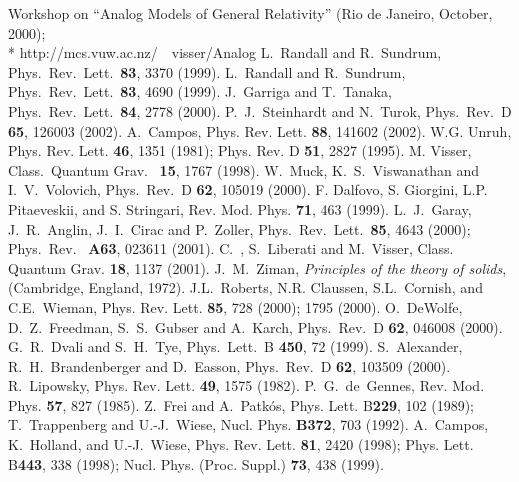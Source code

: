 \documentclass[a4paper,prl,showpacs,twocolumn]{revtex4}
\begin{document}
\begin{thebibliography}{99}

Workshop on ``Analog Models of General Relativity'' (Rio de Janeiro,
October, 2000); 
\\*
{\sf http://mcs.vuw.ac.nz/~\myHighlight{$\tilde{}$}\coordHE{}~visser/Analog}
L.~Randall and R.~Sundrum,
Phys.\ Rev.\ Lett.\  {\bf 83}, 3370 (1999).
L.~Randall and R.~Sundrum,
Phys.\ Rev.\ Lett.\  {\bf 83}, 4690 (1999).
J.~Garriga and T.~Tanaka, 
Phys.\ Rev.\ Lett.\ {\bf 84}, 2778 (2000). 
P.~J.~Steinhardt and N.~Turok,
Phys.\ Rev.\ D {\bf 65}, 126003 (2002).
A.~Campos,
  Phys. Rev. Lett. {\bf 88}, 141602 (2002).
W.G. Unruh, 
Phys. Rev. Lett. {\bf 46}, 1351 (1981);
Phys. Rev. D {\bf 51}, 2827 (1995). 
M. Visser,
Class.~Quantum Grav.~ {\bf 15}, 1767 (1998).
W.~Muck, K.~S.~Viswanathan and I.~V.~Volovich,
Phys.\ Rev.\ D {\bf 62}, 105019 (2000).
F. Dalfovo, S. Giorgini, L.P. Pitaeveskii, and S. Stringari,
Rev. Mod. Phys. {\bf 71}, 463 (1999).
L.~J.~Garay, J.~R.~Anglin, J.~I.~Cirac and P.~Zoller,
Phys.~Rev.~Lett.~{\bf 85}, 4643 (2000);
Phys.~Rev.~ {\bf A63}, 023611 (2001).
C.~\Barcelo, S.~Liberati and M.~Visser,
Class. Quantum Grav. {\bf 18}, 1137 (2001).
J.~M.~Ziman,
{\sl Principles of the theory of solids},
(Cambridge, England, 1972).
J.L.~Roberts, N.R. Claussen, S.L.~Cornish, and C.E.~Wieman, 
Phys. Rev. Lett. {\bf 85}, 728 (2000); 1795 (2000).
O.~DeWolfe, D.~Z.~Freedman, S.~S.~Gubser and A.~Karch,
Phys.\ Rev.\ D {\bf 62}, 046008 (2000).
G.~R.~Dvali and S.~H.~Tye,
Phys.\ Lett.\ B {\bf 450}, 72 (1999).
S.~Alexander, R.~H.~Brandenberger and D.~Easson,
Phys.\ Rev.\ D {\bf 62}, 103509 (2000).
R.~Lipowsky,
  Phys. Rev. Lett. {\bf 49}, 1575 (1982).
P.~G.~de~Gennes,
  Rev. Mod. Phys. {\bf 57}, 827 (1985).
Z.~Frei and A.~Patk\'os,
  Phys. Lett. B{\bf 229}, 102 (1989);
T.~Trappenberg and U.-J.~Wiese,
  Nucl. Phys. {\bf B372}, 703 (1992).
A.~Campos, K.~Holland, and U.-J.~Wiese,
  Phys. Rev. Lett. {\bf 81}, 2420 (1998);
  Phys. Lett. B{\bf 443}, 338 (1998);
  Nucl. Phys. (Proc. Suppl.) {\bf 73}, 438 (1999).





\end{thebibliography}
\end{document}
